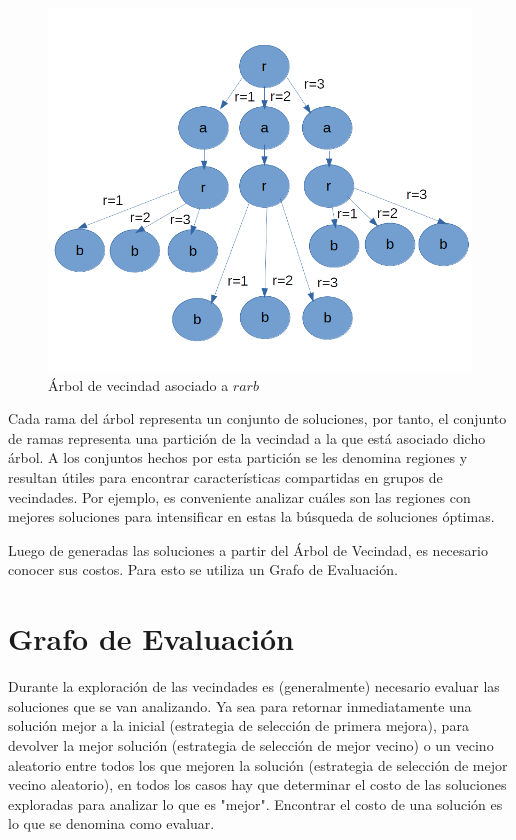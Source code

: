 \begin{figure}
	\centering
	\includegraphics[width=0.9\linewidth]{Graphics/Neigh-Tree}
	\caption{Árbol de vecindad asociado a $rarb$}
	\label{fig:neigh-tree}
\end{figure}

Cada rama del árbol representa un conjunto de soluciones, por tanto, el conjunto de ramas representa una partición de la vecindad a la que está asociado dicho árbol. A los conjuntos hechos por esta partición se les denomina regiones y resultan útiles para encontrar características compartidas en grupos de vecindades. Por ejemplo, es conveniente analizar cuáles son las regiones con mejores soluciones para intensificar en estas la búsqueda de soluciones óptimas.

Luego de generadas las soluciones a partir del Árbol de Vecindad, es necesario conocer sus costos. Para esto se utiliza un Grafo de Evaluación.

\section{Grafo de Evaluación}\label{2-JJ}
Durante la exploración de las vecindades es (generalmente) necesario evaluar las soluciones que se van analizando. Ya sea para retornar inmediatamente una solución mejor a la inicial (estrategia de selección de primera mejora), para devolver la mejor solución (estrategia de selección de mejor vecino) o un vecino aleatorio entre todos los que mejoren la solución (estrategia de selección de mejor vecino aleatorio), en todos los casos hay que determinar el costo de las soluciones exploradas para analizar lo que es "mejor". Encontrar el costo de una solución es lo que se denomina como evaluar.


